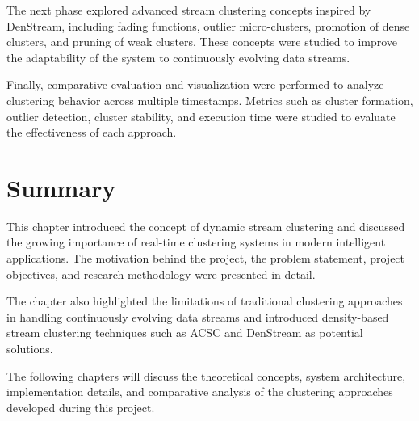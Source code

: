 \documentclass[12pt,a4paper]{report}
\begin{document}
The next phase explored advanced stream clustering concepts inspired by DenStream, including fading functions, outlier micro-clusters, promotion of dense clusters, and pruning of weak clusters. These concepts were studied to improve the adaptability of the system to continuously evolving data streams.

Finally, comparative evaluation and visualization were performed to analyze clustering behavior across multiple timestamps. Metrics such as cluster formation, outlier detection, cluster stability, and execution time were studied to evaluate the effectiveness of each approach.

\section{Summary}

This chapter introduced the concept of dynamic stream clustering and discussed the growing importance of real-time clustering systems in modern intelligent applications. The motivation behind the project, the problem statement, project objectives, and research methodology were presented in detail.

The chapter also highlighted the limitations of traditional clustering approaches in handling continuously evolving data streams and introduced density-based stream clustering techniques such as ACSC and DenStream as potential solutions.

The following chapters will discuss the theoretical concepts, system architecture, implementation details, and comparative analysis of the clustering approaches developed during this project.
\end{document}

